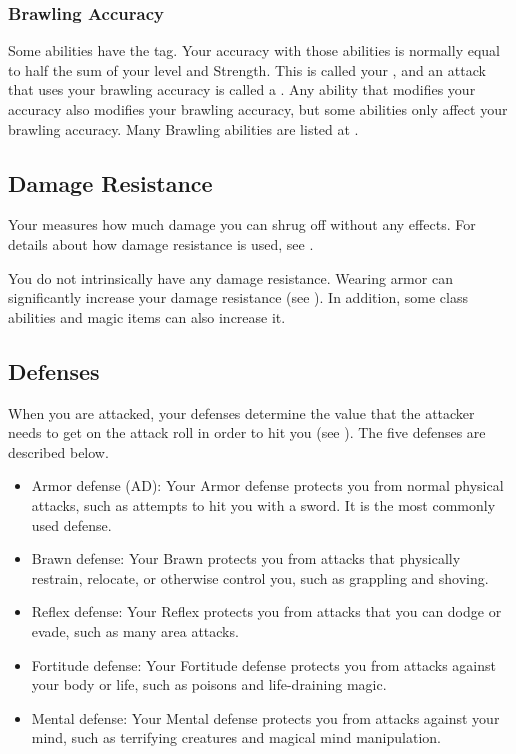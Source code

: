     \subsubsection{Brawling Accuracy}\label{Brawling Accuracy}
      Some abilities have the  tag.
      Your accuracy with those abilities is normally equal to half the sum of your level and Strength.
      This is called your , and an attack that uses your brawling accuracy is called a .
      Any ability that modifies your accuracy also modifies your brawling accuracy, but some abilities only affect your brawling accuracy.
      Many Brawling abilities are listed at .

  \subsection{Damage Resistance}\label{Damage Resistance}
    Your  measures how much damage you can shrug off without any effects.
    For details about how damage resistance is used, see .

    You do not intrinsically have any damage resistance.
    Wearing armor can significantly increase your damage resistance (see ).
    In addition, some class abilities and magic items can also increase it.

  \subsection{Defenses}\label{Defenses}
    When you are attacked, your defenses determine the value that the attacker needs to get on the attack roll in order to hit you (see ).
    The five defenses are described below.
    \begin{itemize}
      \item Armor defense (AD): Your Armor defense protects you from normal physical attacks, such as attempts to hit you with a sword.
        It is the most commonly used defense.
      \item Brawn defense: Your Brawn protects you from attacks that physically restrain, relocate, or otherwise control you, such as grappling and shoving.
      \item Reflex defense: Your Reflex protects you from attacks that you can dodge or evade, such as many area attacks.
      \item Fortitude defense: Your Fortitude defense protects you from attacks against your body or life, such as poisons and life-draining magic.
      \item Mental defense: Your Mental defense protects you from attacks against your mind, such as terrifying creatures and magical mind manipulation.
    \end{itemize}

